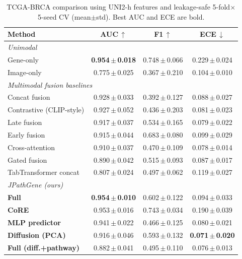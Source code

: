 \begin{table}[t]
\centering
\caption{TCGA-BRCA comparison using UNI2-h features and leakage-safe
5-fold$\times$5-seed CV (mean$\pm$std). Best AUC and ECE are bold.}
\label{tab:uni_compare}
\begin{tabular}{lccc}
\toprule
Method & AUC\,$\uparrow$ & F1\,$\uparrow$ & ECE\,$\downarrow$ \\
\midrule
\multicolumn{4}{l}{\emph{Unimodal}}\\
Gene-only & \textbf{0.954\,$\pm$\,0.018} & 0.748\,$\pm$\,0.066 & 0.229\,$\pm$\,0.024 \\
Image-only & 0.775\,$\pm$\,0.025 & 0.367\,$\pm$\,0.210 & 0.104\,$\pm$\,0.010 \\
\midrule
\multicolumn{4}{l}{\emph{Multimodal fusion baselines}}\\
Concat fusion & 0.928\,$\pm$\,0.033 & 0.392\,$\pm$\,0.127 & 0.088\,$\pm$\,0.027 \\
Contrastive (CLIP-style) & 0.927\,$\pm$\,0.052 & 0.436\,$\pm$\,0.203 & 0.081\,$\pm$\,0.023 \\
Late fusion & 0.917\,$\pm$\,0.037 & 0.534\,$\pm$\,0.165 & 0.079\,$\pm$\,0.022 \\
Early fusion & 0.915\,$\pm$\,0.044 & 0.683\,$\pm$\,0.080 & 0.099\,$\pm$\,0.029 \\
Cross-attention & 0.910\,$\pm$\,0.037 & 0.470\,$\pm$\,0.109 & 0.078\,$\pm$\,0.014 \\
Gated fusion & 0.890\,$\pm$\,0.042 & 0.515\,$\pm$\,0.093 & 0.087\,$\pm$\,0.017 \\
TabTransformer concat & 0.807\,$\pm$\,0.024 & 0.497\,$\pm$\,0.062 & 0.119\,$\pm$\,0.027 \\
\midrule
\multicolumn{4}{l}{\emph{JPathGene (ours)}}\\
\textbf{Full} & \textbf{0.954\,$\pm$\,0.010} & 0.602\,$\pm$\,0.122 & 0.094\,$\pm$\,0.033 \\
\textbf{CoRE} & 0.953\,$\pm$\,0.016 & 0.743\,$\pm$\,0.034 & 0.190\,$\pm$\,0.039 \\
\textbf{MLP predictor} & 0.941\,$\pm$\,0.022 & 0.466\,$\pm$\,0.125 & 0.080\,$\pm$\,0.021 \\
\textbf{Diffusion (PCA)} & 0.916\,$\pm$\,0.046 & 0.593\,$\pm$\,0.132 & \textbf{0.071\,$\pm$\,0.020} \\
\textbf{Full (diff.+pathway)} & 0.882\,$\pm$\,0.041 & 0.495\,$\pm$\,0.110 & 0.076\,$\pm$\,0.013 \\
\bottomrule
\end{tabular}
\end{table}
